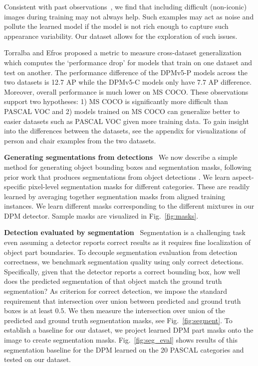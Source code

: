 Consistent with past observations~\cite{zhu2012we}, we find that including difficult (non-iconic) images during training may not always help. Such examples may act as noise and pollute the learned model if the model is not rich enough to capture such appearance variability. Our dataset allows for the exploration of such issues.

Torralba and Efros \cite{torralba2011unbiased} proposed a metric to measure cross-dataset generalization which computes the `performance drop' for models that train on one dataset and test on another. The performance difference of the DPMv5-P models across the two datasets is 12.7 AP while the DPMv5-C models only have 7.7 AP difference. Moreover, overall performance is much lower on MS COCO. These observations support two hypotheses: 1) MS COCO is significantly more difficult than PASCAL VOC and 2) models trained on MS COCO can generalize better to easier datasets such as PASCAL VOC given more training data. To gain insight into the differences between the datasets, see the appendix for visualizations of person and chair examples from the two datasets.

\textbf{Generating segmentations from detections}~ We now describe a simple method for generating object bounding boxes and segmentation masks, following prior work that produces segmentations from object detections \cite{brox2011object,yang2012layered,ramanan2007using,dai2012learning}. We learn aspect-specific pixel-level segmentation masks for different categories. These are readily learned by averaging together segmentation masks from aligned training instances. We learn different masks corresponding to the different mixtures in our DPM detector. Sample masks are visualized in Fig.~\ref{fig:masks}.

\textbf{Detection evaluated by segmentation}~ Segmentation is a challenging task even assuming a detector reports correct results as it requires fine localization of object part boundaries. To decouple segmentation evaluation from detection correctness, we benchmark segmentation quality using only correct detections. Specifically, given that the detector reports a correct bounding box, how well does the predicted segmentation of that object match the ground truth segmentation? As criterion for correct detection, we impose the standard requirement that intersection over union between predicted and ground truth boxes is at least $0.5$. We then measure the intersection over union of the predicted and ground truth segmentation masks, see Fig.~\ref{fig:segment}. To establish a baseline for our dataset, we project learned DPM part masks onto the image to create segmentation masks. Fig.~\ref{fig:seg_eval} shows results of this segmentation baseline for the DPM learned on the 20 PASCAL categories and tested on our dataset.

